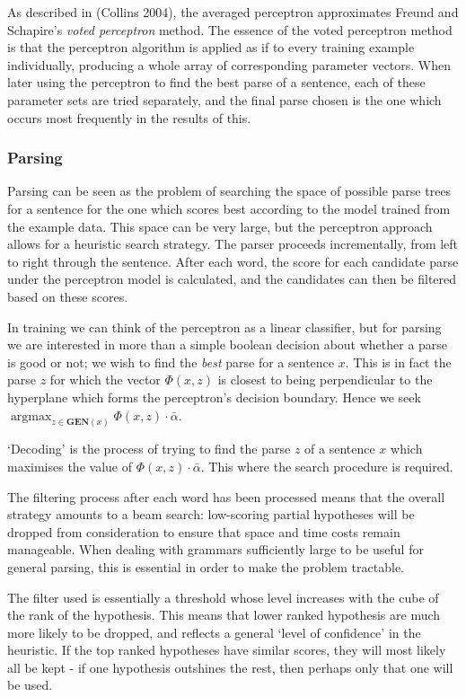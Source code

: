 \documentclass[11pt]{article}
\begin{document}
As described in (Collins 2004)\cite{Collins2004}, the averaged perceptron
approximates Freund and Schapire's\cite{Freund1999} \emph{voted perceptron}
method.  The essence of the voted perceptron method is that the perceptron
algorithm is applied as if to every training example individually, producing a
whole array of corresponding parameter vectors. When later using the perceptron
to find the best parse of a sentence, each of these parameter sets are tried
separately, and the final parse chosen is the one which occurs most frequently
in the results of this.

\subsubsection*{Parsing}
Parsing can be seen as the problem of searching the space of possible parse
trees for a sentence for the one which scores best according to the model
trained from the example data. This space can be very large, but the perceptron
approach allows for a heuristic search strategy. The parser proceeds
incrementally, from left to right through the sentence. After each word, the
score for each candidate parse under the perceptron model is calculated, and
the candidates can then be filtered based on these scores. 

In training we can think of the perceptron as a linear classifier, but for
parsing we are interested in more than a simple boolean decision about whether
a parse is good or not; we wish to find the \emph{best} parse for a sentence
$x$. This is in fact the parse $z$ for which the vector $\Phi(x, z)$ is closest
to being perpendicular to the hyperplane which forms the perceptron's decision
boundary. Hence we seek $\operatorname{arg max}_{z \in \textbf{GEN}(x)} \Phi(x, z) \cdot \bar{\alpha}$.

`Decoding' is the process of trying to find the parse $z$ of a sentence $x$ which maximises the value of $\Phi(x,z) \cdot \bar{\alpha}$. This where the search procedure is required.

The filtering process after each word has been processed means that the overall
strategy amounts to a beam search: low-scoring partial hypotheses will be
dropped from consideration to ensure that space and time costs remain
manageable. When dealing with grammars sufficiently large to be useful for
general parsing, this is essential in order to make the problem tractable.

The filter used is essentially a threshold whose level increases with the cube
of the rank of the hypothesis. This means that lower ranked hypothesis are much
more likely to be dropped, and reflects a general `level of confidence' in the
heuristic. If the top ranked hypotheses have similar scores, they will most
likely all be kept - if one hypothesis outshines the rest, then perhaps only
that one will be used.
\end{document}
